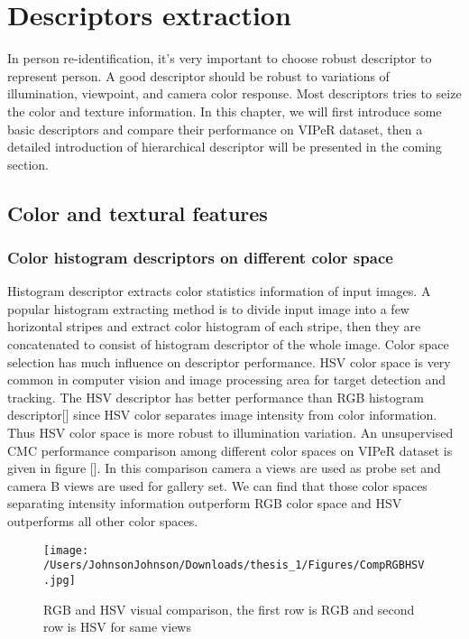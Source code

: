 \chapter{Descriptors extraction}
In person re-identification, it's very important to choose robust descriptor to represent person. A good descriptor should be robust to variations of illumination, viewpoint, and camera color response. Most descriptors tries to seize the color and texture information. In this chapter, we will first introduce some basic descriptors and compare their performance on VIPeR dataset, then a detailed introduction of hierarchical descriptor will be presented in the coming section.


\section{Color and textural features}
\subsection{Color histogram descriptors on different color space}
Histogram descriptor extracts color statistics information of input images. A popular histogram extracting method is to divide input image into a few horizontal stripes and extract color histogram of each stripe, then they are concatenated to consist of histogram descriptor of the whole image. Color space selection has much influence on descriptor performance. HSV color space is very common in computer vision and image processing area for target detection and tracking. The HSV descriptor has better performance than RGB histogram descriptor[] since HSV color separates image intensity from color information. Thus HSV color space is more robust to illumination variation. An unsupervised CMC performance comparison among different color spaces on VIPeR dataset is given in figure []. In this comparison camera a views are used as probe set and camera B views are used for gallery set. We can find that those color spaces separating intensity information outperform RGB color space and HSV outperforms all other color spaces.

\begin{figure}[H]
\centering
\texttt{[image: /Users/JohnsonJohnson/Downloads/thesis\_1/Figures/CompRGBHSV.jpg]}
\caption{RGB and HSV visual comparison, the first row is RGB and second row is HSV for same views }
\vspace{0em}
\end{figure} 

